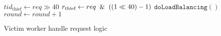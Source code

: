 \begin{algorithm}[bth]
\begin{algorithmic}[1]
     \STATE $tid_{\text{thief}} \gets req\gg40$
    \STATE $r_{\text{thief}} \gets req \And ((1\ll40)-1)$
        \STATE $\texttt{doLoadBalancing}()$
        \STATE $round \gets round + 1$
    \ENDIF
    
\end{algorithmic}

\vspace{1ex}

\caption{Victim worker handle request logic}
\label{algo:victim-logic}
\end{algorithm}